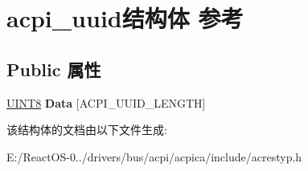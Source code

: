\hypertarget{structacpi__uuid}{}\section{acpi\+\_\+uuid结构体 参考}
\label{structacpi__uuid}
\subsection*{Public 属性}
\begin{DoxyCompactItemize}
\item 
\mbox{\label{structacpi__uuid_a1b6ea2524b5656aa2784cafed786e3eb}} 
\hyperlink{_processor_bind_8h_ab27e9918b538ce9d8ca692479b375b6a}{U\+I\+N\+T8} {\bfseries Data} \mbox{[}A\+C\+P\+I\+\_\+\+U\+U\+I\+D\+\_\+\+L\+E\+N\+G\+TH\mbox{]}
\end{DoxyCompactItemize}


该结构体的文档由以下文件生成\+:\begin{DoxyCompactItemize}
\item 
E\+:/\+React\+O\+S-\/0../drivers/bus/acpi/acpica/include/acrestyp.\+h\end{DoxyCompactItemize}
